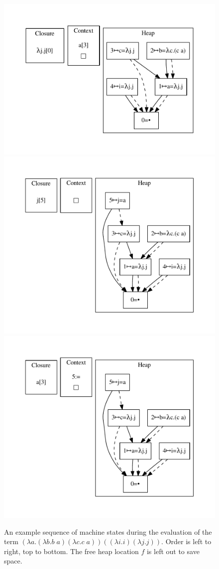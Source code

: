\begin{figure}
\includegraphics[width=\linewidth/3]{figures/18.pdf}
\includegraphics[width=\linewidth/3]{figures/19.pdf}
\includegraphics[width=\linewidth/3]{figures/20.pdf}
\caption{An example sequence of machine states during the evaluation of the term
$(\lambda a.(\lambda b.b \; a) (\lambda c.c
\; a)) ((\lambda i.i) (\lambda j.j))$. Order is left to right, top to bottom.
The free heap location $f$ is left out to save space.}
\label{fig:states}
\end{figure}
